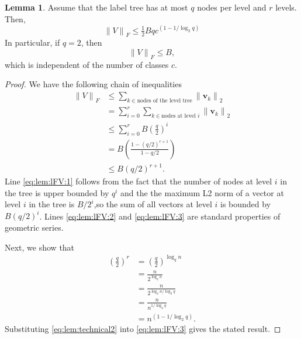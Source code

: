 \documentclass[twoside]{article}
\theoremstyle{definition}
\newtheorem{lemma}{Lemma}
\newcommand{\vv}{\mathbf v}
\newcommand{\ltwo}[1]{{\lVert {#1} \rVert}_2}
\newcommand{\lF}[1]{{\lVert {#1} \rVert}_F}
\begin{document}
\begin{lemma}
    Assume that the label tree has at most $q$ nodes per level and $r$ levels.
    Then,
    \begin{equation}
        \lF{V} \le \tfrac12 Bq c^{(1 - 1/\log_2 q)}
    \end{equation}
    In particular, if $q=2$, then
    \begin{equation}
        \lF{V} \le B,
    \end{equation}
    which is independent of the number of classes $c$.
\end{lemma}
\begin{proof}
    We have the following chain of inequalities
    \begin{align}
        \lF{V} 
        &\le \sum_{k\in \text{nodes of the level tree}} \ltwo{\vv_k}
        \\
        &= \sum_{i=0}^r \sum_{k\in \text{nodes at level $i$}} \ltwo{\vv_k}
        \\
        &\le \sum_{i=0}^r B\left(\frac {q} {2}\right)^i
        \label{eq:lem:lFV:1}
        \\
        &=
        B\left(\frac{1 - (q/2)^{r+1}}{1-q/2}\right)
        \label{eq:lem:lFV:2}
        \\
        &\le
        B(q/2)^{r+1}.
        \label{eq:lem:lFV:3}
    \end{align}
    Line \eqref{eq:lem:lFV:1} follows from the fact that the number of nodes at level $i$ in the tree is upper bounded by $q^i$ and the the maximum L2 norm of a vector at level $i$ in the tree is $B/2^i$,so the sum of all vectors at level $i$ is bounded by $B(q/2)^i$.
    Lines \eqref{eq:lem:lFV:2} and \eqref{eq:lem:lFV:3} are standard properties of geometric series.

    Next, we show that
    \begin{equation}
    \begin{split}
        \left(\frac q 2\right)^r
        &=
        \left(\frac q 2\right)^{\log_q n}\\
        &=
        \frac{n}{2^{\log_q n}}\\
        &=
        \frac{n}{2^{{\log_2 n}/{\log_2 q}}}\\
        &=
        \frac{n}{n^{1/\log_2 q}}\\
        &=
        n^{\left(1 - {1}/{\log_2 q}\right)}
        .
        \label{eq:lem:technical2}
    \end{split}
    \end{equation}
    Substituting \eqref{eq:lem:technical2} into \eqref{eq:lem:lFV:3} gives the stated result.
\end{proof}
\end{document}
